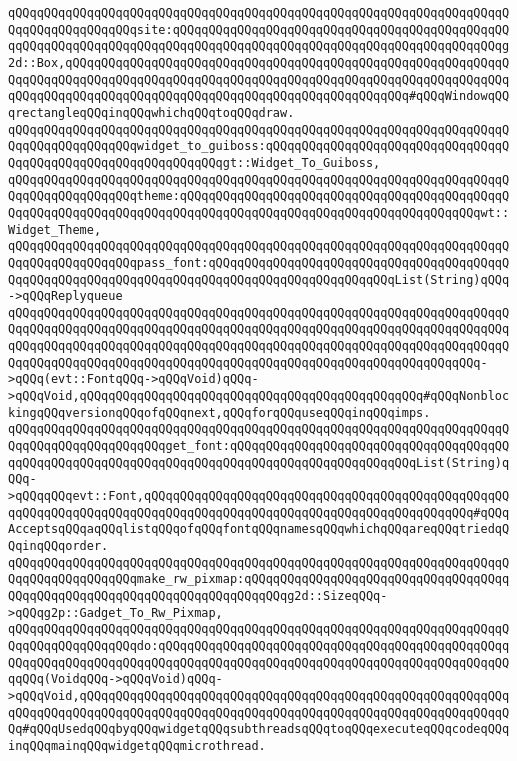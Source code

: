 \verb|qQQqqQQqqQQqqQQqqQQqqQQqqQQqqQQqqQQqqQQqqQQqqQQqqQQqqQQqqQQqqQQqqQQqqQQqqQQqqQQqqQQqqQQqsite:qQQqqQQqqQQqqQQqqQQqqQQqqQQqqQQqqQQqqQQqqQQqqQQqqQQqqQQqqQQqqQQqqQQqqQQqqQQqqQQqqQQqqQQqqQQqqQQqqQQqqQQqqQQqqQQqqQQqg2d::Box,qQQqqQQqqQQqqQQqqQQqqQQqqQQqqQQqqQQqqQQqqQQqqQQqqQQqqQQqqQQqqQQqqQQqqQQqqQQqqQQqqQQqqQQqqQQqqQQqqQQqqQQqqQQqqQQqqQQqqQQqqQQqqQQqqQQqqQQqqQQqqQQqqQQqqQQqqQQqqQQqqQQqqQQqqQQqqQQqqQQqqQQqqQQq#qQQqWindowqQQqrectangleqQQqinqQQqwhichqQQqtoqQQqdraw.|\newline
\verb|qQQqqQQqqQQqqQQqqQQqqQQqqQQqqQQqqQQqqQQqqQQqqQQqqQQqqQQqqQQqqQQqqQQqqQQqqQQqqQQqqQQqqQQqwidget_to_guiboss:qQQqqQQqqQQqqQQqqQQqqQQqqQQqqQQqqQQqqQQqqQQqqQQqqQQqqQQqqQQqqQQqgt::Widget_To_Guiboss,|\newline
\verb|qQQqqQQqqQQqqQQqqQQqqQQqqQQqqQQqqQQqqQQqqQQqqQQqqQQqqQQqqQQqqQQqqQQqqQQqqQQqqQQqqQQqqQQqtheme:qQQqqQQqqQQqqQQqqQQqqQQqqQQqqQQqqQQqqQQqqQQqqQQqqQQqqQQqqQQqqQQqqQQqqQQqqQQqqQQqqQQqqQQqqQQqqQQqqQQqqQQqqQQqqQQqwt::Widget_Theme,|\newline
\verb|qQQqqQQqqQQqqQQqqQQqqQQqqQQqqQQqqQQqqQQqqQQqqQQqqQQqqQQqqQQqqQQqqQQqqQQqqQQqqQQqqQQqqQQqpass_font:qQQqqQQqqQQqqQQqqQQqqQQqqQQqqQQqqQQqqQQqqQQqqQQqqQQqqQQqqQQqqQQqqQQqqQQqqQQqqQQqqQQqqQQqqQQqqQQqList(String)qQQq->qQQqReplyqueue|\newline
\verb|qQQqqQQqqQQqqQQqqQQqqQQqqQQqqQQqqQQqqQQqqQQqqQQqqQQqqQQqqQQqqQQqqQQqqQQqqQQqqQQqqQQqqQQqqQQqqQQqqQQqqQQqqQQqqQQqqQQqqQQqqQQqqQQqqQQqqQQqqQQqqQQqqQQqqQQqqQQqqQQqqQQqqQQqqQQqqQQqqQQqqQQqqQQqqQQqqQQqqQQqqQQqqQQqqQQqqQQqqQQqqQQqqQQqqQQqqQQqqQQqqQQqqQQqqQQqqQQqqQQqqQQqqQQqqQQqqQQq->qQQq(evt::FontqQQq->qQQqVoid)qQQq->qQQqVoid,qQQqqQQqqQQqqQQqqQQqqQQqqQQqqQQqqQQqqQQqqQQqqQQq#qQQqNonblockingqQQqversionqQQqofqQQqnext,qQQqforqQQquseqQQqinqQQqimps.|\newline
\verb|qQQqqQQqqQQqqQQqqQQqqQQqqQQqqQQqqQQqqQQqqQQqqQQqqQQqqQQqqQQqqQQqqQQqqQQqqQQqqQQqqQQqqQQqqQQqget_font:qQQqqQQqqQQqqQQqqQQqqQQqqQQqqQQqqQQqqQQqqQQqqQQqqQQqqQQqqQQqqQQqqQQqqQQqqQQqqQQqqQQqqQQqqQQqqQQqList(String)qQQq->qQQqqQQqevt::Font,qQQqqQQqqQQqqQQqqQQqqQQqqQQqqQQqqQQqqQQqqQQqqQQqqQQqqQQqqQQqqQQqqQQqqQQqqQQqqQQqqQQqqQQqqQQqqQQqqQQqqQQqqQQqqQQqqQQq#qQQqAcceptsqQQqaqQQqlistqQQqofqQQqfontqQQqnamesqQQqwhichqQQqareqQQqtriedqQQqinqQQqorder.|\newline
\verb|qQQqqQQqqQQqqQQqqQQqqQQqqQQqqQQqqQQqqQQqqQQqqQQqqQQqqQQqqQQqqQQqqQQqqQQqqQQqqQQqqQQqqQQqmake_rw_pixmap:qQQqqQQqqQQqqQQqqQQqqQQqqQQqqQQqqQQqqQQqqQQqqQQqqQQqqQQqqQQqqQQqqQQqqQQqqQQqg2d::SizeqQQq->qQQqg2p::Gadget_To_Rw_Pixmap,|\newline
\verb|qQQqqQQqqQQqqQQqqQQqqQQqqQQqqQQqqQQqqQQqqQQqqQQqqQQqqQQqqQQqqQQqqQQqqQQqqQQqqQQqqQQqqQQqdo:qQQqqQQqqQQqqQQqqQQqqQQqqQQqqQQqqQQqqQQqqQQqqQQqqQQqqQQqqQQqqQQqqQQqqQQqqQQqqQQqqQQqqQQqqQQqqQQqqQQqqQQqqQQqqQQqqQQqqQQqqQQq(VoidqQQq->qQQqVoid)qQQq->qQQqVoid,qQQqqQQqqQQqqQQqqQQqqQQqqQQqqQQqqQQqqQQqqQQqqQQqqQQqqQQqqQQqqQQqqQQqqQQqqQQqqQQqqQQqqQQqqQQqqQQqqQQqqQQqqQQqqQQqqQQqqQQqqQQqqQQqqQQq#qQQqUsedqQQqbyqQQqwidgetqQQqsubthreadsqQQqtoqQQqexecuteqQQqcodeqQQqinqQQqmainqQQqwidgetqQQqmicrothread.|\newline
